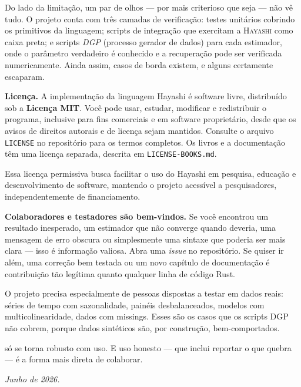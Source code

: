 Do lado da limitação, um par de olhos — por mais criterioso que seja — não vê tudo.
O projeto conta com três camadas de verificação: testes unitários cobrindo os
primitivos da linguagem; scripts de integração que exercitam a \textsc{Hayashi} como
caixa preta; e scripts \textit{DGP} (processo gerador de dados) para cada estimador,
onde o parâmetro verdadeiro é conhecido e a recuperação pode ser verificada
numericamente. Ainda assim, casos de borda existem, e alguns certamente escaparam.

\bigskip

\noindent\textbf{Licença.} A implementação da linguagem Hayashi é software livre,
distribuído sob a \textbf{Licença MIT}. Você pode usar, estudar, modificar e
redistribuir o programa, inclusive para fins comerciais e em software proprietário,
desde que os avisos de direitos autorais e de licença sejam mantidos. Consulte o
arquivo \texttt{LICENSE} no repositório para os termos completos. Os livros e a
documentação têm uma licença separada, descrita em \texttt{LICENSE-BOOKS.md}.

Essa licença permissiva busca facilitar o uso do Hayashi em pesquisa, educação e
desenvolvimento de software, mantendo o projeto acessível a pesquisadores,
independentemente de financiamento.

\bigskip

\noindent\textbf{Colaboradores e testadores são bem-vindos.} Se você encontrou um
resultado inesperado, um estimador que não converge quando deveria, uma mensagem de
erro obscura ou simplesmente uma sintaxe que poderia ser mais clara — isso é
informação valiosa. Abra uma \textit{issue} no repositório. Se quiser ir além, uma
correção bem testada ou um novo capítulo de documentação é contribuição tão legítima
quanto qualquer linha de código Rust.

O projeto precisa especialmente de pessoas dispostas a testar \hayashi{} em dados
reais: séries de tempo com sazonalidade, painéis desbalanceados, modelos com
multicolinearidade, dados com missings. Esses são os casos que os scripts DGP não
cobrem, porque dados sintéticos são, por construção, bem-comportados.

\hayashi{} só se torna robusto com uso. E uso honesto — que inclui reportar o que
quebra — é a forma mais direta de colaborar.

\bigskip

\noindent\textit{Junho de 2026.}
